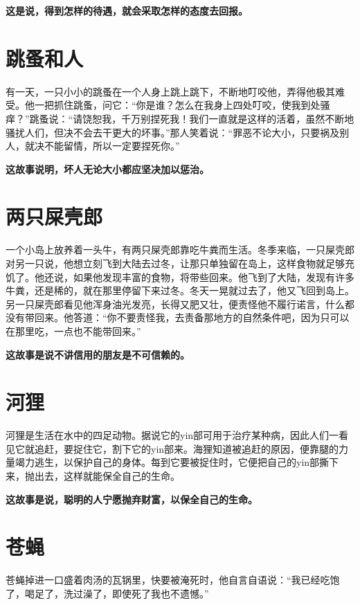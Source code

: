 {\bfseries \color{red}这是说，得到怎样的待遇，就会采取怎样的态度去回报。}

\section{跳蚤和人}

有一天，一只小小的跳蚤在一个人身上跳上跳下，不断地叮咬他，弄得他极其难受。他一把抓住跳蚤，问它：“你是谁？怎么在我身上四处叮咬，使我到处骚痒？”跳蚤说：“请饶恕我，千万别捏死我！我们一直就是这样的活着，虽然不断地骚扰人们，但决不会去干更大的坏事。”那人笑着说：“罪恶不论大小，只要祸及别人，就决不能留情，所以一定要捏死你。”

{\bfseries \color{red}这故事说明，坏人无论大小都应坚决加以惩治。}

\section{两只屎壳郎}

一个小岛上放养着一头牛，有两只屎壳郎靠吃牛粪而生活。冬季来临，一只屎壳郎对另一只说，他想立刻飞到大陆去过冬，让那只单独留在岛上，这样食物就足够充饥了。他还说，如果他发现丰富的食物，将带些回来。他飞到了大陆，发现有许多牛粪，还是稀的，就在那里停留下来过冬。冬天一晃就过去了，他又飞回到岛上。另一只屎壳郎看见他浑身油光发亮，长得又肥又壮，便责怪他不履行诺言，什么都没有带回来。他答道：“你不要责怪我，去责备那地方的自然条件吧，因为只可以在那里吃，一点也不能带回来。”

{\bfseries \color{red}这故事是说不讲信用的朋友是不可信赖的。}

\section{河狸}

河狸是生活在水中的四足动物。据说它的yin部可用于治疗某种病，因此人们一看见它就追赶，要捉住它，割下它的yin部来。海狸知道被追赶的原因，便靠腿的力量竭力逃生，以保护自己的身体。每到它要被捉住时，它便把自己的yin部撕下来，抛出去，这样就能保全自己的生命。

{\bfseries \color{red}这故事是说，聪明的人宁愿抛弃财富，以保全自己的生命。}

\section{苍蝇}

苍蝇掉进一口盛着肉汤的瓦锅里，快要被淹死时，他自言自语说：“我已经吃饱了，喝足了，洗过澡了，即使死了我也不遗憾。”


